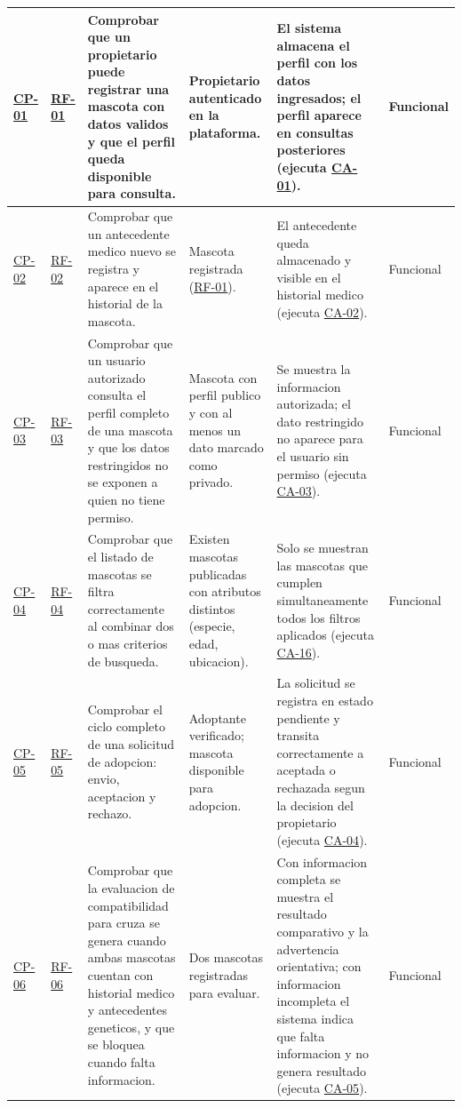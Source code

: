 \documentclass[journal,onecolumn]{IEEEtran}
\begin{document}
\begin{landscape}
\begin{longtable}{@{}p{1.3cm} p{1.3cm} p{4.6cm} p{3.6cm} p{5.2cm} p{1.6cm}@{}}
			\hyperref[tab:CP-01]{CP-01} & \hyperref[tab:RF-01]{RF-01} & Comprobar que un propietario puede registrar una mascota con datos validos y que el perfil queda disponible para consulta. & Propietario autenticado en la plataforma. & El sistema almacena el perfil con los datos ingresados; el perfil aparece en consultas posteriores (ejecuta \hyperref[lst:ca01]{CA-01}). & Funcional \\ \midrule
			\hyperref[cp:02]{CP-02}\label{cp:02} & \hyperref[tab:RF-02]{RF-02} & Comprobar que un antecedente medico nuevo se registra y aparece en el historial de la mascota. & Mascota registrada (\hyperref[tab:RF-01]{RF-01}). & El antecedente queda almacenado y visible en el historial medico (ejecuta \hyperref[lst:ca02]{CA-02}). & Funcional \\ \midrule
			\hyperref[cp:03]{CP-03}\label{cp:03} & \hyperref[tab:RF-03]{RF-03} & Comprobar que un usuario autorizado consulta el perfil completo de una mascota y que los datos restringidos no se exponen a quien no tiene permiso. & Mascota con perfil publico y con al menos un dato marcado como privado. & Se muestra la informacion autorizada; el dato restringido no aparece para el usuario sin permiso (ejecuta \hyperref[lst:ca03]{CA-03}). & Funcional \\ \midrule
			\hyperref[cp:04]{CP-04}\label{cp:04} & \hyperref[tab:RF-04]{RF-04} & Comprobar que el listado de mascotas se filtra correctamente al combinar dos o mas criterios de busqueda. & Existen mascotas publicadas con atributos distintos (especie, edad, ubicacion). & Solo se muestran las mascotas que cumplen simultaneamente todos los filtros aplicados (ejecuta \hyperref[lst:ca16]{CA-16}). & Funcional \\ \midrule
			\hyperref[cp:05]{CP-05}\label{cp:05} & \hyperref[tab:RF-05]{RF-05} & Comprobar el ciclo completo de una solicitud de adopcion: envio, aceptacion y rechazo. & Adoptante verificado; mascota disponible para adopcion. & La solicitud se registra en estado pendiente y transita correctamente a aceptada o rechazada segun la decision del propietario (ejecuta \hyperref[lst:ca04]{CA-04}). & Funcional \\ \midrule
			\hyperref[cp:06]{CP-06}\label{cp:06} & \hyperref[tab:RF-06]{RF-06} & Comprobar que la evaluacion de compatibilidad para cruza se genera cuando ambas mascotas cuentan con historial medico y antecedentes geneticos, y que se bloquea cuando falta informacion. & Dos mascotas registradas para evaluar. & Con informacion completa se muestra el resultado comparativo y la advertencia orientativa; con informacion incompleta el sistema indica que falta informacion y no genera resultado (ejecuta \hyperref[lst:ca05]{CA-05}). & Funcional \\ \midrule

\end{longtable}
\end{landscape}
\end{document}
